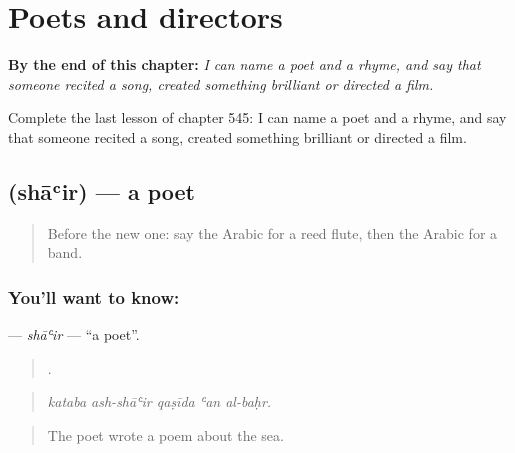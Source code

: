 
\chapter{Poets and directors}
\label{ch:ar-poets-and-directors}

\begin{chapteropening}
\textbf{By the end of this chapter:} \emph{I can name a poet and a rhyme, and say that someone recited a song, created something brilliant or directed a film.}

Complete the last lesson of chapter 545: I can name a poet and a rhyme, and say that someone recited a song, created something brilliant or directed a film.
\end{chapteropening}

\section[\texorpdfstring{\ar{شاعر} (shāʿir)}{شاعر (shāʿir)}]{ (shāʿir) — a poet}

\label{lesson:AR-C545-shair}



\begin{quote}
Before the new one: say the Arabic for a reed flute, then the Arabic for a band.
\end{quote}

\subsection*{You'll want to know: }
\textbf{} — \emph{shāʿir} — \textquotedblleft{}a poet\textquotedblright{}.

\begin{quote}
    .
\end{quote}

\begin{quote}
\emph{kataba ash-shāʿir qaṣīda ʿan al-baḥr.}
\end{quote}

\begin{quote}
The poet wrote a poem about the sea.
\end{quote}

